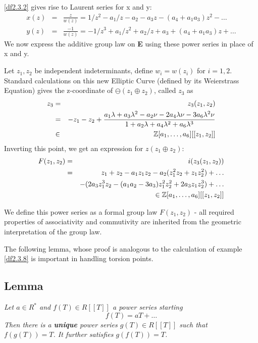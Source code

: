 \ref{df2.3.2} gives rise to Laurent series for x and y:
\begin{eqnarray}
\nonumber x(z) &=& \frac{z}{w(z)} = 1/z^2 - a_1/z - a_2 - a_3z -
(a_4+a_1 a_3)z^2 - \dots\\
\nonumber y(z) &=& \frac{-1}{w(z)} = -1/z^3 +a_1/z^2 +a_2/z +a_3
+(a_4 +a_1a_3)z +\dots
\end{eqnarray}
We now express the additive group law on \textbf E using these
power series in place of x and y.

Let $z_1,z_2$ be independent indeterminants, define $w_i = w(z_i)$
for $i=1,2$. Standard calculations on this new Elliptic Curve
(defined by its Weierstrass Equation) gives the z-coordinate of
$\ominus (z_1 \oplus z_2)$, called $z_3$ as
\begin{eqnarray}
\nonumber z_3 &=& z_3(z_1, z_2)\\
\nonumber     &=& -z_1 - z_2 +\frac{a_1 \lambda +a_3 \lambda^2 -
a_2\nu -2a_4 \lambda\nu - 3 a_6 \lambda^2\nu}{1+a_2\lambda
+a_4\lambda^2 +a_6 \lambda^3}\\
\nonumber &\in& \mathbb Z[a_1,\dots , a_6][[z_1,z_2]]
\end{eqnarray}
Inverting this point, we get an expression for $z(z_1\oplus z_2)$:
\begin{eqnarray}
\nonumber F(z_1,z_2) &=& i(z_3(z_1,z_2))\\
\nonumber            &=& z_1 +z_2 - a_1z_1z_2 - a_2 (z_1^2 z_2
+z_1z_2^2)+\dots \\
\nonumber            & & -(2a_3z_1^3z_2 - (a_1a_2 -3a_3)z_1^2z_2^2
+ 2a_3z_1z_2^3)+\dots \\
\nonumber        & &   \in \mathbb Z[a_1,\dots ,a_6][[z_1,z_2]]
\end{eqnarray}

We define this power series as a formal group law $F(z_1,z_2)$ -
all required properties of associativity and commutivity are
inherited from the geometric interpretation of the group law.

The following lemma, whose proof is analogous to the calculation
of example \ref{df2.3.8} is important in handling torsion points.

\subsection{Lemma}\label{df2.3.3}
\emph{Let $a\in R^*$ and $f(T) \in R[[T]]$ a power series starting
$$f(T)=aT+\dots$$
Then there is a \textbf{unique} power series $g(T)\in R[[T]]$ such
that $f(g(T)) = T$. It further satisfies $g(f(T)) = T$.}

